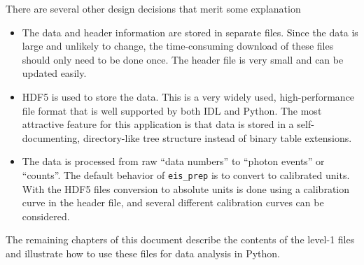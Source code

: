 There are several other design decisions that merit some explanation

\begin{itemize}
  \item The data and header information are stored in separate files. Since the data is large and
    unlikely to change, the time-consuming download of these files should only need to be done
    once. The header file is very small and can be updated easily.
  \item HDF5 is used to store the data. This is a very widely used, high-performance file format
    that is well supported by both IDL and Python. The most attractive feature for this application
    is that data is stored in a self-documenting, directory-like tree structure instead of binary
    table extensions.
  \item The data is processed from raw ``data numbers'' to ``photon events'' or ``counts''. The
    default behavior of \verb+eis_prep+ is to convert to calibrated units. With the HDF5 files
    conversion to absolute units is done using a calibration curve in the header file, and several
    different calibration curves can be considered.
\end{itemize}

The remaining chapters of this document describe the contents of the level-1 files and illustrate
how to use these files for data analysis in Python.
